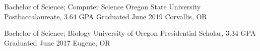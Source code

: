 \showoff
{Bachelor of Science; Computer Science}
{Oregon State University Postbaccalaureate, 3.64 GPA}
{Graduated June 2019}
{Corvallis, OR}

\myBreak

\showoff
{Bachelor of Science; Biology}
{University of Oregon Presidential Scholar, 3.34 GPA}
{Graduated June 2017}
{Eugene, OR}

